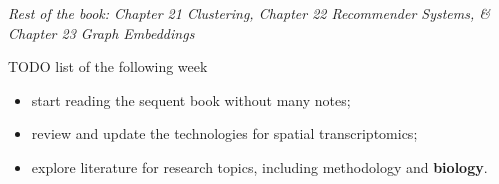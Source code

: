 \documentclass[working]{article}
\begin{document}




% 







% 




\setcounter{section}{6}
\setcounter{subsection}{2}
\begin{center}
\textit{Rest of the book: Chapter 21 Clustering, 
Chapter 22 Recommender Systems, \& Chapter 23 Graph Embeddings}
\end{center}



\newpage

\begin{framed}{\large
TODO list of the following week
\begin{itemize}
    \item start reading the sequent book without many notes;
    \item review and update the technologies for spatial transcriptomics;
    \item explore literature for research topics, including methodology and \textbf{biology}.
\end{itemize}
}
\end{framed}

\listnotes

\end{document}
